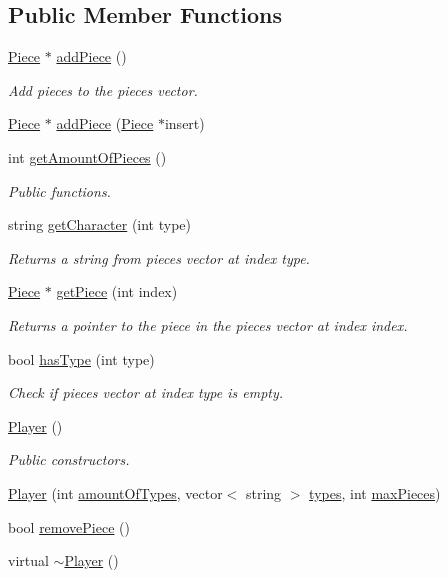 \subsection*{Public Member Functions}
\begin{DoxyCompactItemize}
\item 
\hyperlink{classPiece}{Piece} $\ast$ \hyperlink{classPlayer_ad09c5fa121693aebd9324f5a67b2a4b4}{add\-Piece} ()
\begin{DoxyCompactList}\small\item\em Add pieces to the pieces vector. \end{DoxyCompactList}\item 
\hyperlink{classPiece}{Piece} $\ast$ \hyperlink{classPlayer_acf6a704d66c88132eff94fe0db15ead7}{add\-Piece} (\hyperlink{classPiece}{Piece} $\ast$insert)
\item 
int \hyperlink{classPlayer_a5a545f24c6c256c126cd73f1f9625060}{get\-Amount\-Of\-Pieces} ()
\begin{DoxyCompactList}\small\item\em Public functions. \end{DoxyCompactList}\item 
string \hyperlink{classPlayer_a17af53ee144ccdd489f1d2a88d23b534}{get\-Character} (int type)
\begin{DoxyCompactList}\small\item\em Returns a string from pieces vector at index type. \end{DoxyCompactList}\item 
\hyperlink{classPiece}{Piece} $\ast$ \hyperlink{classPlayer_a8067bf22b680314eb5767753e76b114c}{get\-Piece} (int index)
\begin{DoxyCompactList}\small\item\em Returns a pointer to the piece in the pieces vector at index index. \end{DoxyCompactList}\item 
bool \hyperlink{classPlayer_af053c37a04f7881f5e76272d8c4fc7e6}{has\-Type} (int type)
\begin{DoxyCompactList}\small\item\em Check if pieces vector at index type is empty. \end{DoxyCompactList}\item 
\hyperlink{classPlayer_affe0cc3cb714f6deb4e62f0c0d3f1fd8}{Player} ()
\begin{DoxyCompactList}\small\item\em Public constructors. \end{DoxyCompactList}\item 
\hyperlink{classPlayer_acc7e5bcd2a68c9f89811140e27ebe09c}{Player} (int \hyperlink{classPlayer_a677f323efe4a7534a054345a4d99d40f}{amount\-Of\-Types}, vector$<$ string $>$ \hyperlink{classPlayer_a05f23ead572f763fedd4488d6a82b822}{types}, int \hyperlink{classPlayer_a69e6c3b3ae77235f6f47c49b09e67331}{max\-Pieces})
\item 
bool \hyperlink{classPlayer_a255abeb598abb76c3fb8b82bc39563a0}{remove\-Piece} ()
\item 
virtual \hyperlink{classPlayer_a749d2c00e1fe0f5c2746f7505a58c062}{$\sim$\-Player} ()
\end{DoxyCompactItemize}
